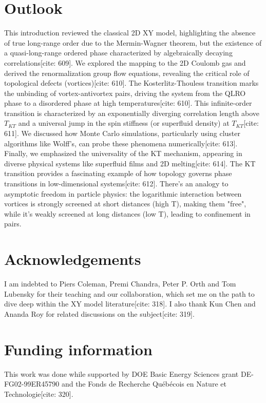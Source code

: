 \documentclass[11pt]{article}
\begin{document}
\section{Outlook}

This introduction reviewed the classical 2D XY model, highlighting the absence of true long-range order due to the Mermin-Wagner theorem, but the existence of a quasi-long-range ordered phase characterized by algebraically decaying correlations[cite: 609]. We explored the mapping to the 2D Coulomb gas and derived the renormalization group flow equations, revealing the critical role of topological defects (vortices)[cite: 610]. The Kosterlitz-Thouless transition marks the unbinding of vortex-antivortex pairs, driving the system from the QLRO phase to a disordered phase at high temperatures[cite: 610]. This infinite-order transition is characterized by an exponentially diverging correlation length above $T_{KT}$ and a universal jump in the spin stiffness (or superfluid density) at $T_{KT}$[cite: 611]. We discussed how Monte Carlo simulations, particularly using cluster algorithms like Wolff's, can probe these phenomena numerically[cite: 613]. Finally, we emphasized the universality of the KT mechanism, appearing in diverse physical systems like superfluid films and 2D melting[cite: 614]. The KT transition provides a fascinating example of how topology governs phase transitions in low-dimensional systems[cite: 612]. There's an analogy to asymptotic freedom in particle physics: the logarithmic interaction between vortices is strongly screened at short distances (high T), making them "free", while it's weakly screened at long distances (low T), leading to confinement in pairs.

\section*{Acknowledgements}
I am indebted to Piers Coleman, Premi Chandra, Peter P. Orth and Tom Lubensky for their teaching and our collaboration, which set me on the path to dive deep within the XY model literature[cite: 318]. I also thank Kun Chen and Ananda Roy for related discussions on the subject[cite: 319].

\section*{Funding information}
This work was done while supported by DOE Basic Energy Sciences grant DE-FG02-99ER45790 and the Fonds de Recherche Québécois en Nature et Technologie[cite: 320].
\end{document}
